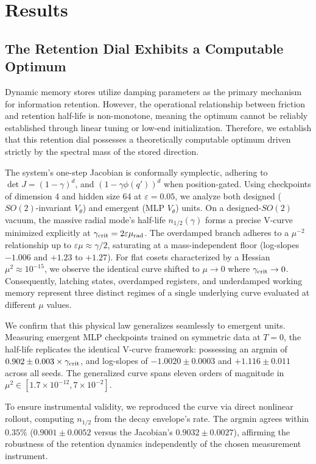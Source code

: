 \documentclass{article}
\begin{document}
\section{Results}\label{sec:results}

\subsection{The Retention Dial Exhibits a Computable Optimum}\label{sec:vcurve}

Dynamic memory stores utilize damping parameters as the primary mechanism for information retention. However, the operational relationship between friction and retention half-life is non-monotone, meaning the optimum cannot be reliably established through linear tuning or low-end initialization. Therefore, we establish that this retention dial possesses a theoretically computable optimum driven strictly by the spectral mass of the stored direction.

The system's one-step Jacobian is conformally symplectic, adhering to $\det J=(1-\gamma)^d$, and $(1-\gamma\phi(q'))^d$ when position-gated. Using checkpoints of dimension 4 and hidden size 64 at $\varepsilon=0.05$, we analyze both designed ($SO(2)$-invariant $V_\theta$) and emergent (MLP $V_\theta$) units. On a designed-$SO(2)$ vacuum, the massive radial mode's half-life $n_{1/2}(\gamma)$ forms a precise V-curve minimized explicitly at $\gamma_{\rm crit}=2\varepsilon\mu_{\rm rad}$. The overdamped branch adheres to a $\mu^{-2}$ relationship up to $\varepsilon\mu\approx\gamma/2$, saturating at a mass-independent floor (log-slopes $-1.006$ and $+1.23$ to $+1.27$). For flat cosets characterized by a Hessian $\mu^2\approx10^{-15}$, we observe the identical curve shifted to $\mu\to0$ where $\gamma_{\rm crit}\to0$. Consequently, latching states, overdamped registers, and underdamped working memory represent three distinct regimes of a single underlying curve evaluated at different $\mu$ values.

We confirm that this physical law generalizes seamlessly to emergent units. Measuring emergent MLP checkpoints trained on symmetric data at $T=0$, the half-life replicates the identical V-curve framework: possessing an argmin of $0.902\pm0.003\times\gamma_{\rm crit}$, and log-slopes of $-1.0020\pm0.0003$ and $+1.116\pm0.011$ across all seeds. The generalized curve spans eleven orders of magnitude in $\mu^2 \in [1.7\times10^{-12}, 7\times10^{-2}]$.

To ensure instrumental validity, we reproduced the curve via direct nonlinear rollout, computing $n_{1/2}$ from the decay envelope's rate. The argmin agrees within $0.35\%$ ($0.9001\pm0.0052$ versus the Jacobian's $0.9032\pm0.0027$), affirming the robustness of the retention dynamics independently of the chosen measurement instrument.
\end{document}

